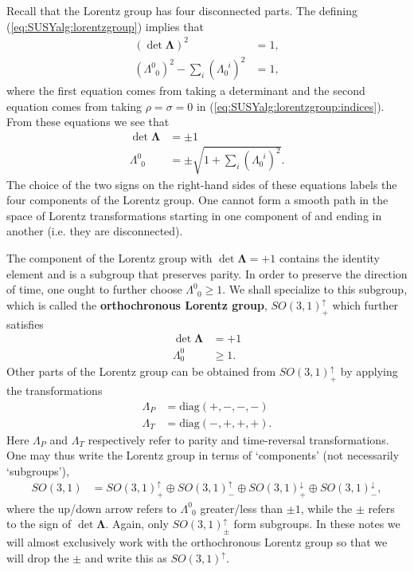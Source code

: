 \documentclass[12pt]{article}
\numberwithin{equation}{section}    %
\begin{document}
Recall that the Lorentz group has four disconnected parts. The defining  (\ref{eq:SUSYalg:lorentzgroup}) implies that 
\begin{align}
	\left(\det \mathbf\Lambda\right)^2 &= 1,\\
	(\Lambda^0_{\phantom{0}0})^2-\sum_i(\Lambda_0^{\phantom{0}i})^2 &=1,
\end{align}
where the first equation comes from taking a determinant and the second equation comes from taking $\rho=\sigma=0$ in  (\ref{eq:SUSYalg:lorentzgroup:indices}). From these equations we see that 
\begin{align}
	\det\mathbf\Lambda &= \pm 1\\
	\Lambda^0_{\phantom 00} &= \pm \sqrt{1+\sum_i(\Lambda_0^{\phantom{0}i})^2}.
\end{align}
The choice of the two signs on the right-hand sides of these equations labels the four components of the Lorentz group. One cannot form a smooth path in the space of Lorentz transformations starting in one component of and ending in another (i.e. they are disconnected).

The component of the Lorentz group with $\det \mathbf\Lambda = +1$ contains the identity element and is a subgroup that preserves parity. In order to preserve the direction of time, one ought to further choose $\Lambda^0_{\phantom{0}0}\geq 1$. We shall specialize to this subgroup, which is called the \textbf{orthochronous Lorentz group}, $SO(3,1)^\uparrow_+$ which further satisfies 
\begin{align}
	\det \mathbf{\Lambda}&= +1\\
	\Lambda^0_0 &\geq 1.
\end{align}
Other parts of the Lorentz group can be obtained from $SO(3,1)^\uparrow_+$ by applying the transformations
\begin{align}
	\Lambda_P &= \text{diag}(+,-,-,-)\\
	\Lambda_T &= \text{diag}(-,+,+,+).
\end{align}
Here $\Lambda_P$ and $\Lambda_T$ respectively refer to parity and time-reversal transformations. One may thus write the Lorentz group in terms of `components' (not necessarily `subgroups'),
\begin{align}
	SO(3,1) &= SO(3,1)^\uparrow_+ \oplus SO(3,1)^\uparrow_- \oplus SO(3,1)^\downarrow_+ \oplus SO(3,1)^\downarrow_-,
\end{align}
where the up/down arrow refers to $\Lambda^0_{\phantom 00}$ greater/less than $\pm 1$, while the $\pm$ refers to the sign of $\det \mathbf\Lambda$. Again, only $SO(3,1)^\uparrow_\pm$ form subgroups. In these notes we will almost exclusively work with the orthochronous Lorentz group so that we will drop the $\pm$ and write this as $SO(3,1)^\uparrow$. 
\end{document}
